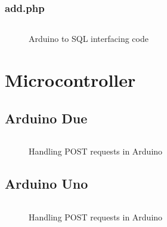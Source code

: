\subsubsection{add.php}

\begin{figure}[H]
\begin{lstlisting}[style=PHP]

\end{lstlisting}
\caption{Arduino to SQL interfacing code}
\label{snip:php}
\end{figure}
\section{Microcontroller}

\subsection{Arduino Due}

\begin{figure}[H]
\begin{lstlisting}[style=Arduino]

\end{lstlisting}
\caption{Handling POST requests in Arduino}
\label{snip:post}
\end{figure}


\subsection{Arduino Uno}

\begin{figure}[H]
\begin{lstlisting}[style=Arduino]

\end{lstlisting}
\caption{Handling POST requests in Arduino}
\label{snip:post}
\end{figure}
